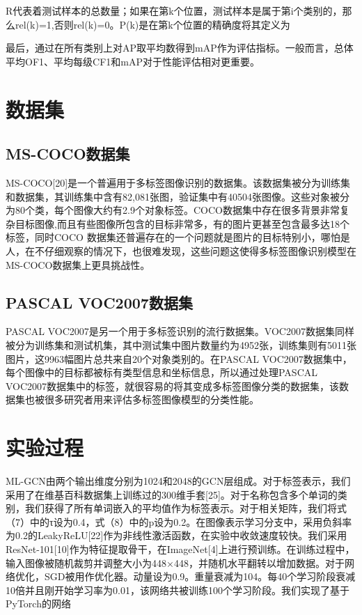 R代表着测试样本的总数量；如果在第k个位置，测试样本是属于第i个类别的，那么rel(k)=1,否则rel(k)=0。P(k)是在第k个位置的精确度将其定义为

最后，通过在所有类别上对AP取平均数得到mAP作为评估指标。一般而言，总体平均OF1、平均每级CF1和mAP对于性能评估相对更重要。

\section{数据集}

\subsection{MS-COCO数据集}
MS-COCO[20]是一个普遍用于多标签图像识别的数据集。该数据集被分为训练集和数据集，其训练集中含有82,081张图，验证集中有40504张图像。这些对象被分为80个类，每个图像大约有2.9个对象标签。COCO数据集中存在很多背景非常复杂目标图像,而且有些图像所包含的目标非常多，有的图片更甚至包含最多达18个标签，同时COCO 数据集还普遍存在的一个问题就是图片的目标特别小，哪怕是人，在不仔细观察的情况下，也很难发现，这些问题这使得多标签图像识别模型在MS-COCO数据集上更具挑战性。

\subsection{PASCAL VOC2007数据集}
PASCAL VOC2007是另一个用于多标签识别的流行数据集。VOC2007数据集同样被分为训练集和测试机集，其中测试集中图片数量约为4952张，训练集则有5011张图片，这9963幅图片总共来自20个对象类别的。在PASCAL VOC2007数据集中，每个图像中的目标都被标有类型信息和坐标信息，所以通过处理PASCAL VOC2007数据集中的标签，就很容易的将其变成多标签图像分类的数据集，该数据集也被很多研究者用来评估多标签图像模型的分类性能。

\section{实验过程}

ML-GCN由两个输出维度分别为1024和2048的GCN层组成。对于标签表示，我们采用了在维基百科数据集上训练过的300维手套[25]。对于名称包含多个单词的类别，我们获得了所有单词嵌入的平均值作为标签表示。对于相关矩阵，我们将式（7）中的τ设为0.4，式（8）中的p设为0.2。在图像表示学习分支中，采用负斜率为0.2的LeakyReLU[22]作为非线性激活函数，在实验中收敛速度较快。我们采用ResNet-101[10]作为特征提取骨干，在ImageNet[4]上进行预训练。在训练过程中，输入图像被随机裁剪并调整大小为448×448，并随机水平翻转以增加数据。对于网络优化，SGD被用作优化器。动量设为0.9。重量衰减为104。每40个学习阶段衰减10倍并且刚开始学习率为0.01，该网络共被训练100个学习阶段。我们实现了基于PyTorch的网络

